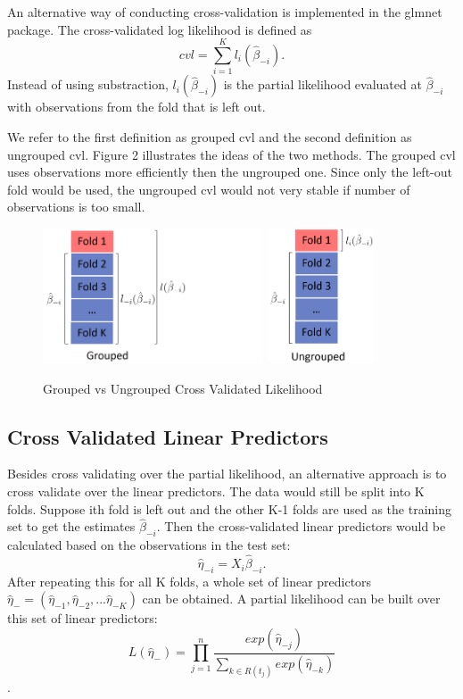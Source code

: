 \documentclass{article}\usepackage[]{graphicx}\usepackage[]{color}
\begin{document}
An alternative way of conducting cross-validation is implemented in the glmnet package. The cross-validated log likelihood is defined as\begin{equation}cvl = \sum_{i=1}^{K} l_{i}(\hat{\beta}_{-i}).\end{equation} Instead of using substraction, $l_{i}(\hat{\beta}_{-i})$ is the partial likelihood evaluated at $\hat{\beta}_{-i}$ with observations from the fold that is left out. 

We refer to the first definition as grouped cvl and the second definition as ungrouped cvl. Figure 2 illustrates the ideas of the two methods. The grouped cvl uses observations more efficiently then the ungrouped one. Since only the left-out fold would be used, the ungrouped cvl would not very stable if number of observations is too small.

\begin{figure}
    \centering
		\includegraphics[height= 4cm ]{./figures/02_1.png}
		\includegraphics[height= 4cm ]{./figures/02_2.png}
    \caption{Grouped vs Ungrouped Cross Validated Likelihood}
\end{figure}	

  \subsection{Cross Validated Linear Predictors}

Besides cross validating over the partial likelihood, an alternative approach is to cross validate over the linear predictors. The data would still be split into K folds. Suppose ith fold is left out and the other K-1 folds are used as the training set to get the estimates $\hat{\beta}_{-i}$. Then the cross-validated linear predictors would be calculated based on the observations in the test set:  \begin{equation}\hat{\eta}_{-i} = X_{i}\hat{\beta}_{-i}.\end{equation} After repeating this for all K folds, a whole set of linear predictors  $\hat{\eta}_{-} = ( \hat{\eta}_{-1},  \hat{\eta}_{-2} , ...  \hat{\eta}_{-K})$ can be obtained. A partial likelihood can be built over this set of linear predictors: \begin{equation} L(\hat{\eta}_{-}) = \prod_{j=1}^{n} \frac{exp (\hat{\eta}_{-j})}{\sum_{ k \in R(t_{j})}exp (\hat{\eta}_{-k})}\end{equation}.
\end{document}
